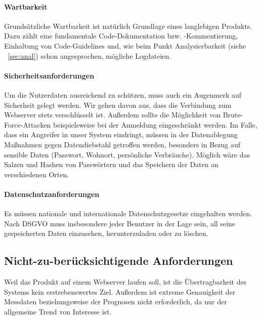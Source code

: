 \paragraph{Wartbarkeit}

Grundsätzliche Wartbarkeit ist natürlich Grundlage eines langlebigen Produkts.
Dazu zählt eine fundamentale Code-Dokumentation bzw. -Kommentierung, Einhaltung von Code-Guidelines und,
wie beim Punkt Analysierbarkeit (siehe ~\ref{sec:anal}) schon angesprochen, mögliche Logdateien.


\paragraph{Sicherheitsanforderungen}
Um die Nutzerdaten ausreichend zu schützen, muss auch ein Augenmerk auf Sicherheit gelegt werden.
Wir gehen davon aus, dass die Verbindung zum Webserver stets verschlüsselt ist.
Außerdem sollte die Möglichkeit von Brute-Force-Attacken beispielsweise bei der Anmeldung eingeschränkt werden.
Im Falle, dass ein Angreifer in unser System eindringt, müssen in der Datenablegung Maßnahmen gegen Datendiebstahl
getroffen werden, besonders in Bezug auf sensible Daten (Passwort, Wohnort, persönliche Verbräuche).
Möglich wäre das Salzen und Hashen von Passwörtern und das Speichern der Daten an verschiedenen Orten.

\paragraph{Datenschutzanforderungen}
Es müssen nationale und internationale Datenschutzgesetze eingehalten werden.
Nach DSGVO muss insbesondere jeder Benutzer in der Lage sein, all seine gespeicherten Daten einzusehen,
herunterzuladen oder zu löschen.

\subsection{Nicht-zu-berücksichtigende Anforderungen}
Weil das Produkt auf einem Webserver laufen soll, ist die Übertragbarkeit des Systems kein erstrebenswertes Ziel.
Außerdem ist extreme Genauigkeit der Messdaten beziehungsweise der Prognosen nicht erforderlich,
da nur der allgemeine Trend von Interesse ist.